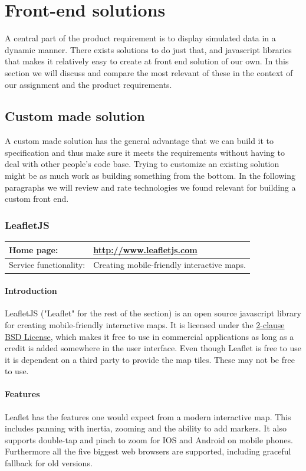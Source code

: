 \documentclass[11pt,a4paper,titlepage,oneside]{report}
\begin{document}
\section{Front-end solutions}
  A central part of the product requirement is to display simulated data in a dynamic manner. There exists solutions to do just that, and javascript libraries that makes it relatively easy to create at front end solution of our own. In this section we will discuss and compare the most relevant of these in the context of our assignment and the product requirements. 
  \subsection{Custom made solution}
    A custom made solution has the general advantage that we can build it to specification and thus make sure it meets the requirements without having to deal with other people's code base. Trying to customize an existing solution might be as much work as building something from the bottom. In the following paragraphs we will review and rate technologies we found relevant for building a custom front end.
    \subsubsection{LeafletJS}
    \begin{tabular}{|p{4cm}|p{8cm}|}
      \hline
      Home page: & \url{http://www.leafletjs.com} \\
      \hline
      Service functionality: & Creating mobile-friendly interactive maps. \\
      \hline
    \end{tabular}
    
    \paragraph{Introduction} \indent
    LeafletJS ("Leaflet" for the rest of the section) is an \gls{open source} javascript library for creating mobile-friendly interactive maps. It is licensed under the \href{'https://github.com/Leaflet/Leaflet/blob/master/LICENSE'}{2-clause \gls{BSD} License}, which makes it free to use in commercial applications as long as a credit is added somewhere in the user interface.
    Even though Leaflet is free to use it is dependent on a third party to provide the map tiles. These may not be free to use.

    \paragraph{Features}
    Leaflet has the features one would expect from a modern interactive map. This includes panning with inertia, zooming and the ability to add markers. It also supports double-tap and pinch to zoom for IOS and Android on mobile phones. Furthermore all the five biggest web browsers are supported, including graceful fallback for old versions.
    
\end{document}
